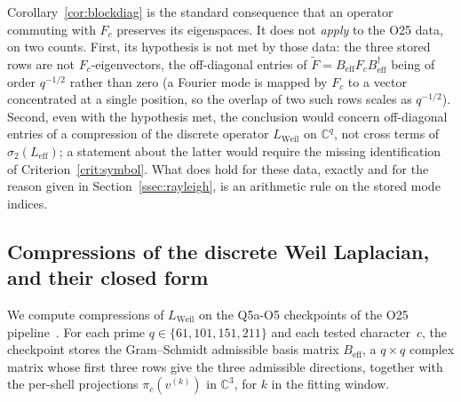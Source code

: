 \documentclass[11pt,a4paper]{article}
\begin{document}
    \noindent
    Corollary~\ref{cor:blockdiag} is the standard consequence that an operator commuting with $F_c$
    preserves its eigenspaces.
    It does not \emph{apply} to the O25 data, on two counts.
    First, its hypothesis is not met by those data: the three stored rows are not
    $F_c$-eigenvectors, the off-diagonal entries of
    $\tilde F = B_{\mathrm{eff}} F_c B_{\mathrm{eff}}^\dagger$ being of order $q^{-1/2}$ rather
    than zero (a Fourier mode is mapped by $F_c$ to a vector concentrated at a single position,
    so the overlap of two such rows scales as $q^{-1/2}$).
    Second, even with the hypothesis met, the conclusion would concern off-diagonal entries of a
    compression of the discrete operator $L_{\mathrm{Weil}}$ on $\mathbb{C}^q$, not cross terms of
    $\sigma_2(L_{\mathrm{eff}})$; a statement about the latter would require the missing
    identification of Criterion~\ref{crit:symbol}.
    What does hold for these data, exactly and for the reason given in
    Section~\ref{ssec:rayleigh}, is an arithmetic rule on the stored mode indices.

  \subsection{Compressions of the discrete Weil Laplacian, and their closed form}
    \label{sec:numval}
    \label{ssec:rayleigh}

    We compute compressions of $L_{\mathrm{Weil}}$ on the Q5a-O5 checkpoints of the O25
    pipeline~\cite{Beau2026a29}.
    For each prime $q \in \{61, 101, 151, 211\}$ and each tested character~$c$, the checkpoint
    stores the Gram--Schmidt admissible basis matrix $B_{\mathrm{eff}}$, a $q \times q$ complex
    matrix whose first three rows give the three admissible directions, together with the
    per-shell projections $\pi_c(v^{(k)})$ in $\mathbb{C}^3$, for $k$ in the fitting window.
\end{document}
